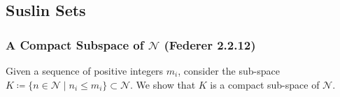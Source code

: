 \subsection{Suslin Sets}

\subsubsection{A Compact Subspace of \(\mathcal N\) (Federer 2.2.12)}

Given a sequence of positive integers \(m_i\), consider the sub-space
\(K \coloneqq \{n \in \mathcal N \mid n_i \leq m_i\} \subset \mathcal N\). We show that \(K\) is a compact
sub-space of \(\mathcal N\). 
